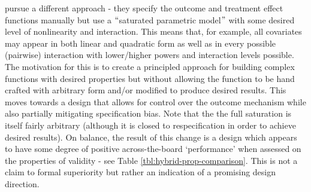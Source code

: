 \documentclass[../main.tex]{subfiles}
\begin{document}
\vspace{\baselineskip}
\cite{Kern2016AssessingPopulations} pursue a different approach - they specify the outcome and treatment effect functions manually but use a $``$saturated parametric model$"$  with some desired level of nonlinearity and interaction. This means that, for example, all covariates may appear in both linear and quadratic form as well as in every possible (pairwise) interaction with lower/higher powers and interaction levels possible. The motivation for this is to create a principled approach for building complex functions with desired properties but without allowing the function to be hand crafted with arbitrary form and/or modified to produce desired results. This moves towards a design that allows for control over the outcome mechanism while also partially mitigating specification bias. Note that the the full saturation is itself fairly arbitrary (although it is closed to respecification in order to achieve desired results). On balance, the result of this change is a design which appears to have some degree of positive across-the-board ‘performance’ when assessed on the properties of validity - see Table \ref{tbl:hybrid-prop-comparison}. This is not a claim to formal superiority but rather an indication of a promising design direction.\par


\vspace{\baselineskip}


\end{document}
